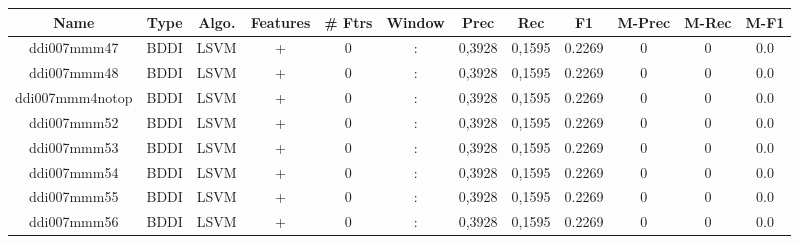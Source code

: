 \documentclass[a4paper]{article}
\begin{document}
\begin{landscape}
\begin{center}
\begin{tabular}{ |c|c|c|c|c|c|c|c|c|c|c|c|} 
 \hline
 	Name & Type & Algo. & Features & \# Ftrs & Window & Prec & Rec & F1 & M-Prec & M-Rec & M-F1\\
 \hline

 		

 	
 
 	
 		
 		\small{ ddi007mmm47 } & BDDI & LSVM & +  &  0 &  :  &  0,3928 & 0,1595 & 0.2269  &  0 & 0 & 0.0 \\
 		

 	
 
 	
 		
 		\small{ ddi007mmm48 } & BDDI & LSVM & +  &  0 &  :  &  0,3928 & 0,1595 & 0.2269  &  0 & 0 & 0.0 \\
 		

 	
 
 	
 		
 		\small{ ddi007mmm4notop } & BDDI & LSVM & +  &  0 &  :  &  0,3928 & 0,1595 & 0.2269  &  0 & 0 & 0.0 \\
 		

 	
 
 	
 		
 		\small{ ddi007mmm52 } & BDDI & LSVM & +  &  0 &  :  &  0,3928 & 0,1595 & 0.2269  &  0 & 0 & 0.0 \\
 		

 	
 
 	
 		
 		\small{ ddi007mmm53 } & BDDI & LSVM & +  &  0 &  :  &  0,3928 & 0,1595 & 0.2269  &  0 & 0 & 0.0 \\
 		

 	
 
 	
 		
 		\small{ ddi007mmm54 } & BDDI & LSVM & +  &  0 &  :  &  0,3928 & 0,1595 & 0.2269  &  0 & 0 & 0.0 \\
 		

 	
 
 	
 		
 		\small{ ddi007mmm55 } & BDDI & LSVM & +  &  0 &  :  &  0,3928 & 0,1595 & 0.2269  &  0 & 0 & 0.0 \\
 		

 	
 
 	
 		
 		\small{ ddi007mmm56 } & BDDI & LSVM & +  &  0 &  :  &  0,3928 & 0,1595 & 0.2269  &  0 & 0 & 0.0 \\
 		


\end{tabular}
\end{center}
\end{landscape}
\end{document}
